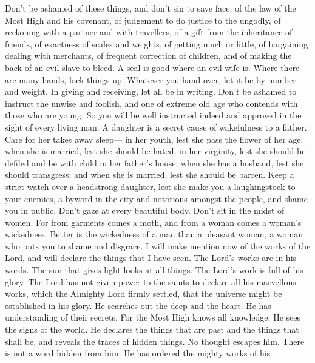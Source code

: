  Don't be ashamed of these things, and don't sin to save
face:  of the law of the Most High and his covenant, of
judgement to do justice to the ungodly,  of reckoning with a
partner and with travellers, of a gift from the inheritance of friends,
 of exactness of scales and weights, of getting much or
little,  of bargaining dealing with merchants, of frequent
correction of children, and of making the back of an evil slave to
bleed.  A seal is good where an evil wife is. Where there
are many hands, lock things up.  Whatever you hand over, let
it be by number and weight. In giving and receiving, let all be in
writing.  Don't be ashamed to instruct the unwise and
foolish, and one of extreme old age who contends with those who are
young. So you will be well instructed indeed and approved in the sight
of every living man.  A daughter is a secret cause of
wakefulness to a father. Care for her takes away sleep--- in her youth,
lest she pass the flower of her age; when she is married, lest she
should be hated;  in her virginity, lest she should be
defiled and be with child in her father's house; when she has a husband,
lest she should transgress; and when she is married, lest she should be
barren.  Keep a strict watch over a headstrong daughter,
lest she make you a laughingstock to your enemies, a byword in the city
and notorious amongst the people, and shame you in public. 
Don't gaze at every beautiful body. Don't sit in the midst of women.
 For from garments comes a moth, and from a woman comes a
woman's wickedness.  Better is the wickedness of a man than
a pleasant woman, a woman who puts you to shame and disgrace.
 I will make mention now of the works of the Lord, and will
declare the things that I have seen. The Lord's works are in his words.
 The sun that gives light looks at all things. The Lord's
work is full of his glory.  The Lord has not given power to
the saints to declare all his marvellous works, which the Almighty Lord
firmly settled, that the universe might be established in his glory.
 He searches out the deep and the heart. He has
understanding of their secrets. For the Most High knows all knowledge.
He sees the signs of the world.  He declares the things
that are past and the things that shall be, and reveals the traces of
hidden things.  No thought escapes him. There is not a word
hidden from him.  He has ordered the mighty works of his
